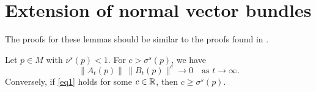 \chapter{Extension of normal vector bundles}\label{condition-verification}
The proofs for these lemmas should be similar to the proofs found in \cite{dieci1997lyapunov}.

\begin{lem}\label{lemma1}
	Let \(p \in M\) with \(\nu^s(p) < 1\). For \(c > \sigma^s(p)\), we have 
	\begin{equation}\label{eq1}
		\| A_t(p) \|\, \|B_t(p) \|^c \to 0 \quad \text{as } t\to\infty.
	\end{equation}
	Conversely, if \cref{eq1} holds for some \(c\in \mathbb{R}\), then \(c\geq \sigma^s(p).\)
\end{lem}

